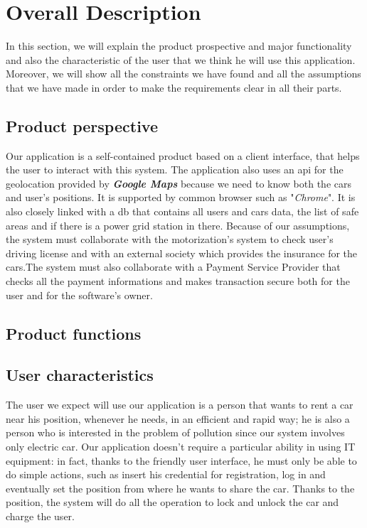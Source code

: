 \section{Overall Description} \label{sec:description}
In this section, we will explain the product prospective and major functionality and also the characteristic of the user that we think he will use this application. Moreover, we will show all the constraints we have found and all the assumptions that we have made in order to make the requirements clear in all their parts. 

\subsection{Product perspective} \label{subsec:prod_persp}
Our application is a self-contained product based on a client interface, that helps the user to interact with this system. The application also uses an \acs{api} for the geolocation provided by \emph{\textbf{Google Maps}} because we need to know both the cars and user's positions. It is supported by common browser such as "\emph{Chrome}". It is also closely linked with a \acs{db} that contains all users and cars data, the list of safe areas and if there is a power grid station in there. Because of our assumptions, the system must collaborate with the motorization's system to check user's driving license and with an external society which provides the  insurance for the cars.The system must also collaborate with a Payment Service Provider that checks all the payment informations and makes transaction secure both for the user and for the software's owner.



\subsection{Product functions} \label{subsec:prod_funct}


\subsection{User characteristics} \label{subsec:user_char}
The user we expect will use our application is a person that wants to rent a car near his position, whenever he needs, in an efficient and rapid way; he is also a person who is interested in the problem of pollution since our system involves only electric car. Our application doesn't require a particular ability in using IT equipment: in fact, thanks to the friendly user interface, he must only be able to do simple actions, such as insert his credential for registration, log in and eventually set the position from where he wants to share the car. Thanks to the position, the system will do all the operation to lock and unlock the car and charge the user.

